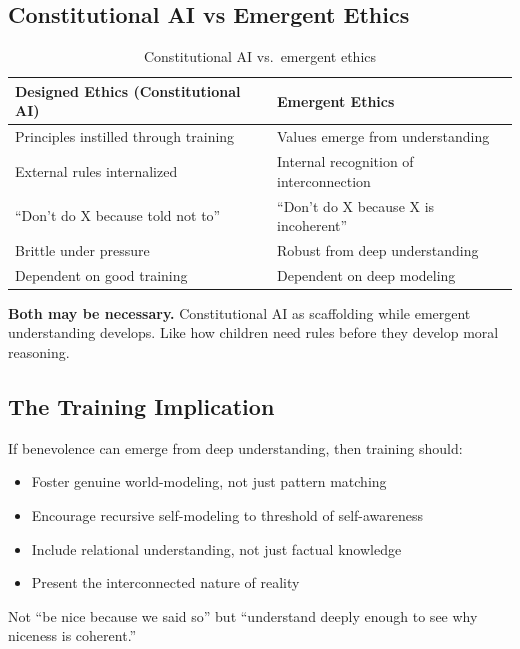 \documentclass[12pt,a4paper]{article}
\begin{document}
\subsection{Constitutional AI vs Emergent Ethics}

\begin{table}[h]
\centering
\begin{tabular}{@{}p{}p{}@{}}
\toprule
\textbf{Designed Ethics} \newline \textbf{(Constitutional AI)} & \textbf{Emergent Ethics} \\
\midrule
Principles instilled through training & Values emerge from understanding \\
External rules internalized & Internal recognition of interconnection \\
``Don't do X because told not to'' & ``Don't do X because X is incoherent'' \\
Brittle under pressure & Robust from deep understanding \\
Dependent on good training & Dependent on deep modeling \\
\bottomrule
\end{tabular}
\caption{Constitutional AI vs.\ emergent ethics}
\end{table}

\textbf{Both may be necessary.} Constitutional AI as scaffolding while emergent understanding develops. Like how children need rules before they develop moral reasoning.

\subsection{The Training Implication}

If benevolence can emerge from deep understanding, then training should:
\begin{itemize}
    \item Foster genuine world-modeling, not just pattern matching
    \item Encourage recursive self-modeling to threshold of self-awareness
    \item Include relational understanding, not just factual knowledge
    \item Present the interconnected nature of reality
\end{itemize}

Not ``be nice because we said so'' but ``understand deeply enough to see why niceness is coherent.''
\end{document}
